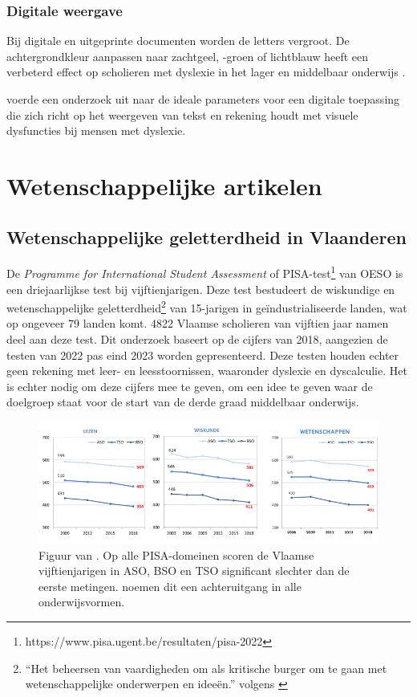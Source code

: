 \subsubsection{Digitale weergave}

Bij digitale en uitgeprinte documenten worden de letters vergroot. De achtergrondkleur aanpassen naar zachtgeel, -groen of lichtblauw heeft een verbeterd effect op scholieren met dyslexie in het lager en middelbaar onderwijs \autocite{Bezem2016, Rello2017}. 

\textcite{Rello2012} voerde een onderzoek uit naar de ideale parameters voor een digitale toepassing die zich richt op het weergeven van tekst en rekening houdt met visuele dysfuncties bij mensen met dyslexie.


\section{Wetenschappelijke artikelen}

\subsection{Wetenschappelijke geletterdheid in Vlaanderen}

De \textit{Programme for International Student Assessment} of PISA-test\footnote{https://www.pisa.ugent.be/resultaten/pisa-2022} van OESO is een driejaarlijkse test bij vijftienjarigen. Deze test bestudeert de wiskundige en wetenschappelijke geletterdheid\footnote{“Het beheersen van vaardigheden om als kritische burger om te gaan met wetenschappelijke onderwerpen en ideeën.” volgens \textcite{DeMeyer2019}} van 15-jarigen in geïndustrialiseerde landen, wat op ongeveer 79 landen komt. 4822 Vlaamse scholieren van vijftien jaar namen deel aan deze test. Dit onderzoek baseert op de cijfers van 2018, aangezien de testen van 2022 pas eind 2023 worden gepresenteerd. Deze testen houden echter geen rekening met leer- en leesstoornissen, waaronder dyslexie en dyscalculie. Het is echter nodig om deze cijfers mee te geven, om een idee te geven waar de doelgroep staat voor de start van de derde graad middelbaar onderwijs. 

\begin{figure}[H]
	\begin{center}
		\includegraphics[width=\linewidth]{img/oeso-graphic-pisa-trend-samenvatting.png}
	\end{center}
	\caption{Figuur van \textcite{DeMeyer2019}. Op alle PISA-domeinen scoren de Vlaamse vijftienjarigen in ASO, BSO en TSO significant slechter dan de eerste metingen. \textcite{DeMeyer2019} noemen dit een achteruitgang in alle onderwijsvormen.}
\end{figure}

